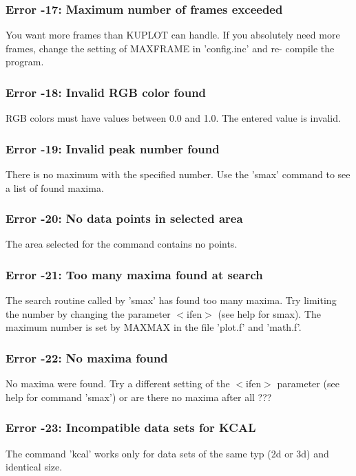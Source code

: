 \subsubsection{Error -17: Maximum number of frames exceeded}
\par
You want more frames than KUPLOT can handle. If you absolutely need 
more frames, change the setting of MAXFRAME in 'config.inc' and re- 
compile the program. 
\subsubsection{Error -18: Invalid RGB color found}
\par
RGB colors must have values between 0.0 and 1.0. The entered value 
is invalid. 
\subsubsection{Error -19: Invalid peak number found}
\par
There is no maximum with the specified number. Use the 'smax' 
command to see a list of found maxima. 
\subsubsection{Error -20: No data points in selected area}
\par
The area selected for the command contains no points. 
\subsubsection{Error -21: Too many maxima found at search}
\par
The search routine called by 'smax' has found too many maxima. Try 
limiting the number by changing the parameter $ <$ifen$> $ (see help for 
smax). The maximum number is set by MAXMAX in the file 'plot.f' and 
'math.f'. 
\subsubsection{Error -22: No maxima found}
\par
No maxima were found. Try a different setting of the $ <$ifen$> $ parameter 
(see help for command 'smax') or are there no maxima after all ??? 
\subsubsection{Error -23: Incompatible data sets for KCAL}
\par
The command 'kcal' works only for data sets of the same typ (2d or 
3d) and identical size. 

